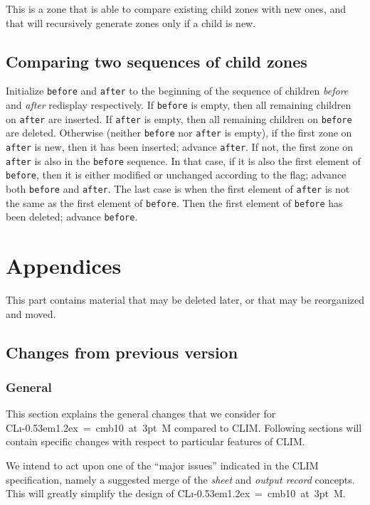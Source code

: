 \documentclass{report}
\def\Tiny{ \font\Tinyfont = cmb10 at 3pt \relax  \Tinyfont}
\def\clim{\textsf{CL{\i}\kern-0.53em\raise1.2ex\hbox{\Tiny 3}M}}
\def\climtwo{CLIM\thinspace{\small II}}
\def\code#1{\texttt{#1}}
\begin{document}
This is a zone that is able to compare existing child zones with
new ones, and that will recursively generate zones only if a child
is new. 

\chapter{Comparing two sequences of child zones}

Initialize \code{before} and \code{after} to the beginning of the
sequence of children \emph{before} and \emph{after} redisplay
respectively.  If \code{before} is empty, then all remaining children
on \code{after} are inserted.  If \code{after} is empty, then all
remaining children on \code{before} are deleted.  Otherwise (neither
\code{before} nor \code{after} is empty), if the first zone on
\code{after} is new, then it has been inserted; advance \code{after}.
If not, the first zone  on \code{after} is also in the \code{before}
sequence.  In that case, if it is also the first element of
\code{before}, then it is either modified or unchanged according to
the flag; advance both \code{before} and \code{after}.  The last case
is when the first element of \code{after} is not the same as the first
element of \code{before}.  Then the first element of \code{before} has
been deleted; advance \code{before}. 

\part{Appendices}

This part contains material that may be deleted later, or that may be
reorganized and moved.  

\appendix
\chapter{Changes from previous version}

\section{General}

This section explains the general changes that we consider for \clim{}
compared to \climtwo{}.  Following sections will contain specific changes
with respect to particular features of \climtwo{}.

We intend to act upon one of the ``major issues'' indicated in the
\climtwo{} specification, namely a suggested merge of the \emph{sheet} and
\emph{output record} concepts.  This will greatly simplify the design
of \clim{}.
\end{document}
